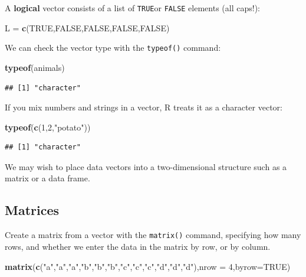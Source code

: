 \documentclass[
]{book}
\newenvironment{Shaded}{\begin{snugshade}}{\end{snugshade}}
\newcommand{\AttributeTok}[1]{\textcolor[rgb]{0.13,0.29,0.53}{#1}}
\newcommand{\ConstantTok}[1]{\textcolor[rgb]{0.56,0.35,0.01}{#1}}
\newcommand{\DecValTok}[1]{\textcolor[rgb]{0.00,0.00,0.81}{#1}}
\newcommand{\FunctionTok}[1]{\textcolor[rgb]{0.13,0.29,0.53}{\textbf{#1}}}
\newcommand{\NormalTok}[1]{#1}
\newcommand{\OtherTok}[1]{\textcolor[rgb]{0.56,0.35,0.01}{#1}}
\newcommand{\StringTok}[1]{\textcolor[rgb]{0.31,0.60,0.02}{#1}}
\theoremstyle{definition}
\theoremstyle{definition}
\theoremstyle{definition}
\theoremstyle{definition}
\theoremstyle{remark}
\begin{document}
A \textbf{logical} vector consists of a list of \texttt{TRUE}or \texttt{FALSE} elements (all caps!):

\begin{Shaded}
\begin{Highlighting}[]
\NormalTok{L }\OtherTok{=} \FunctionTok{c}\NormalTok{(}\ConstantTok{TRUE}\NormalTok{,}\ConstantTok{FALSE}\NormalTok{,}\ConstantTok{FALSE}\NormalTok{,}\ConstantTok{FALSE}\NormalTok{,}\ConstantTok{FALSE}\NormalTok{)}
\end{Highlighting}
\end{Shaded}

We can check the vector type with the \texttt{typeof()} command:

\begin{Shaded}
\begin{Highlighting}[]
\FunctionTok{typeof}\NormalTok{(animals)}
\end{Highlighting}
\end{Shaded}

\begin{verbatim}
## [1] "character"
\end{verbatim}

If you mix numbers and strings in a vector, R treats it as a character vector:

\begin{Shaded}
\begin{Highlighting}[]
\FunctionTok{typeof}\NormalTok{(}\FunctionTok{c}\NormalTok{(}\DecValTok{1}\NormalTok{,}\DecValTok{2}\NormalTok{,}\StringTok{"potato"}\NormalTok{))}
\end{Highlighting}
\end{Shaded}

\begin{verbatim}
## [1] "character"
\end{verbatim}

We may wish to place data vectors into a two-dimensional structure such as a matrix or a data frame.

\subsection*{Matrices}\label{matrices}

Create a matrix from a vector with the \texttt{matrix()} command, specifying how many rows, and whether we enter the data in the matrix by row, or by column.

\begin{Shaded}
\begin{Highlighting}[]
\FunctionTok{matrix}\NormalTok{(}\FunctionTok{c}\NormalTok{(}\StringTok{"a"}\NormalTok{,}\StringTok{"a"}\NormalTok{,}\StringTok{"a"}\NormalTok{,}\StringTok{"b"}\NormalTok{,}\StringTok{"b"}\NormalTok{,}\StringTok{"b"}\NormalTok{,}\StringTok{"c"}\NormalTok{,}\StringTok{"c"}\NormalTok{,}\StringTok{"c"}\NormalTok{,}\StringTok{"d"}\NormalTok{,}\StringTok{"d"}\NormalTok{,}\StringTok{"d"}\NormalTok{),}\AttributeTok{nrow =} \DecValTok{4}\NormalTok{,}\AttributeTok{byrow=}\ConstantTok{TRUE}\NormalTok{)}
\end{Highlighting}
\end{Shaded}
\end{document}
